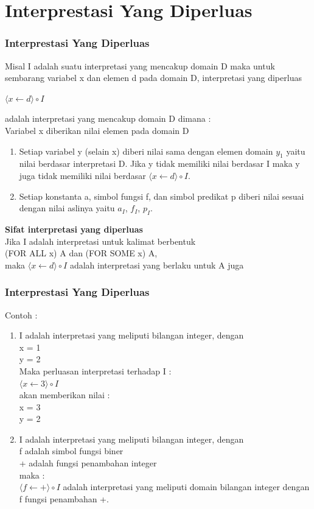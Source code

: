 \documentclass[handout]{beamer}
\theoremstyle{definition}
\theoremstyle{example}
\begin{document}
\section{Interprestasi Yang Diperluas}
\begin{frame}
	\frametitle{Interprestasi Yang Diperluas}
	Misal I adalah suatu interpretasi yang mencakup domain D maka untuk sembarang variabel x dan elemen d pada domain D, interpretasi yang diperluas\\
	\begin{center}
		\textbf{$\langle x \leftarrow d \rangle \circ I $ }
	\end{center}
	adalah interpretasi yang mencakup domain D dimana :\\
	Variabel x diberikan nilai elemen pada domain D
	\begin{enumerate}
		\item Setiap variabel y (selain x) diberi nilai sama dengan elemen domain $y_1$ yaitu nilai berdasar interpretasi D. Jika y tidak memiliki nilai berdasar I maka y juga tidak memiliki nilai berdasar $\langle x \leftarrow d \rangle \circ I $.
		\item Setiap konstanta a, simbol fungsi f, dan simbol predikat p diberi nilai sesuai dengan nilai aslinya yaitu $a_I$, $f_I$, $p_I$.
	\end{enumerate}
	\textbf{Sifat interpretasi yang diperluas}\\	
	Jika I adalah interpretasi untuk kalimat berbentuk\\
	(FOR ALL x) A dan (FOR SOME x) A,\\
	maka $\langle x \leftarrow d \rangle \circ I $ adalah interpretasi yang berlaku untuk A juga
\end{frame}	

\begin{frame}
	\frametitle{Interprestasi Yang Diperluas}
	Contoh :\\
	\begin{enumerate}
		\item  I adalah interpretasi yang meliputi bilangan integer, dengan\\ 
		x = 1\\
		y = 2\\
		Maka perluasan interpretasi terhadap I :\\
		$\langle x \leftarrow 3 \rangle \circ I $\\
		akan memberikan nilai :\\
		x = 3\\
		y = 2
		\item I adalah interpretasi yang meliputi bilangan integer, dengan\\ 
		f adalah simbol fungsi biner\\
		+ adalah fungsi penambahan integer\\
		maka :\\
		$\langle f \leftarrow + \rangle \circ I $ adalah interpretasi yang meliputi domain bilangan integer dengan f fungsi penambahan +.
		
	\end{enumerate}
\end{frame}
\end{document}
